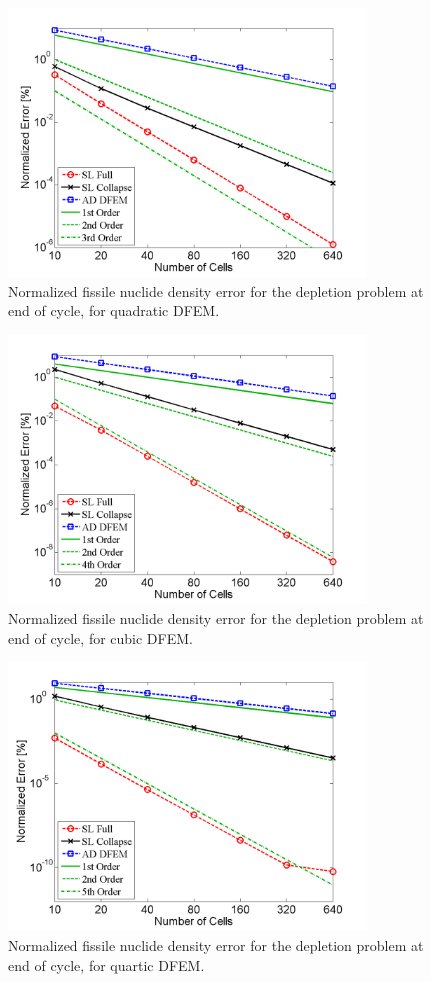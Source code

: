 \begin{figure}[!hbp]
\centering
\includegraphics[width=9.5cm]{chapter5_depletion/FS_P2_norm_err.png}
\caption{Normalized fissile nuclide density error for the depletion problem at end of cycle, for quadratic DFEM.}
\label{fig:depletion_NFS_p2}
\end{figure}

\begin{figure}[!htp]
\centering
\includegraphics[width=9.5cm]{chapter5_depletion/FS_P3_norm_err.png}
\caption{Normalized fissile nuclide density error for the depletion problem at end of cycle, for cubic DFEM.}
\label{fig:depletion_NFS_p3}
\end{figure}

\begin{figure}[!hbp]
\centering
\includegraphics[width=9.5cm]{chapter5_depletion/FS_P4_norm_err.png}
\caption{Normalized fissile nuclide density error for the depletion problem at end of cycle, for quartic DFEM.}
\label{fig:depletion_NFS_p4}
\end{figure}

